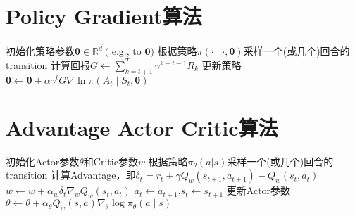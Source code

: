\documentclass[11pt]{ctexart}
\begin{document}
\section{Policy Gradient算法}
\begin{algorithm}[H] %
	\renewcommand{\thealgorithm}{} %
	\caption{} 
	\begin{algorithmic}[1] %
		\STATE 初始化策略参数$\boldsymbol{\theta} \in \mathbb{R}^{d^{\prime}}($ e.g., to $\mathbf{0})$
			\STATE 根据策略$\pi(\cdot \mid \cdot, \boldsymbol{\theta})$采样一个(或几个)回合的transition
				\STATE 计算回报$G \leftarrow \sum_{k=t+1}^{T} \gamma^{k-t-1} R_{k}$
				\STATE 更新策略$\boldsymbol{\theta} \leftarrow {\boldsymbol{\theta}+\alpha \gamma^{t}} G \nabla \ln \pi\left(A_{t} \mid S_{t}, \boldsymbol{\theta}\right)$
			\ENDFOR
		\ENDFOR
	\end{algorithmic}
\end{algorithm}
\clearpage
\section{Advantage Actor Critic算法}
\begin{algorithm}[H] %
	\renewcommand{\thealgorithm}{} %
	\caption{} 
	\begin{algorithmic}[1] %
		\STATE 初始化Actor参数$\theta$和Critic参数$w$
			\STATE 根据策略$\pi_{\theta}(a|s)$采样一个(或几个)回合的transition
				\STATE 计算Advantage，即$ \delta_t = r_t + \gamma Q_w(s_{t+1},a_{t+1})-Q_w(s_t,a_t)$
				\STATE $w \leftarrow w+\alpha_{w} \delta_{t} \nabla_{w} Q_w(s_t,a_t)$
				\STATE $a_t \leftarrow a_{t+1}$,$s_t \leftarrow s_{t+1}$
			\ENDFOR
			\STATE 更新Actor参数$\theta \leftarrow \theta+\alpha_{\theta} Q_{w}(s, a) \nabla_{\theta} \log \pi_{\theta}(a \mid s)$
		\ENDFOR
	\end{algorithmic}
\end{algorithm}
\clearpage
\end{document}
